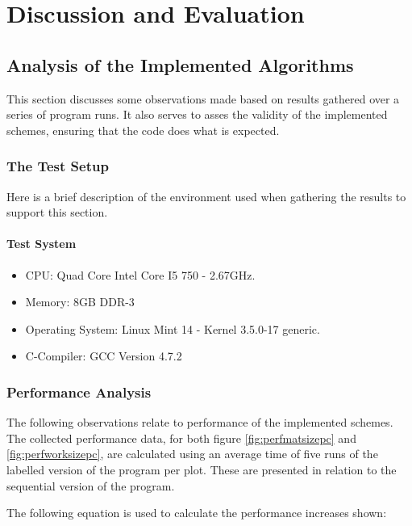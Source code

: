 \chapter{Discussion and Evaluation}
\section{Analysis of the Implemented Algorithms}
\label{sec:analysis}

This section discusses some observations made based on results gathered over a series of program runs.
It also serves to asses the validity of the implemented schemes, ensuring that the code does what is expected.

\subsection*{The Test Setup}

Here is a brief description of the environment used when gathering the results to support this section.

\subsubsection*{Test System}
\begin{itemize}
\item CPU: Quad Core Intel Core I5 750 - 2.67GHz.
\item Memory: 8GB DDR-3
\item Operating System: Linux Mint 14 - Kernel 3.5.0-17 generic.
\item C-Compiler: GCC Version 4.7.2
\end{itemize}

\subsection{Performance Analysis}

The following observations relate to performance of the implemented schemes.
The collected performance data, for both figure \ref{fig:perfmatsizepc} and \ref{fig:perfworksizepc},
are calculated using an average time of five runs of the labelled version of the program per plot.
These are presented in relation to the sequential version of the program. 

The following equation is used to calculate the performance increases shown:

